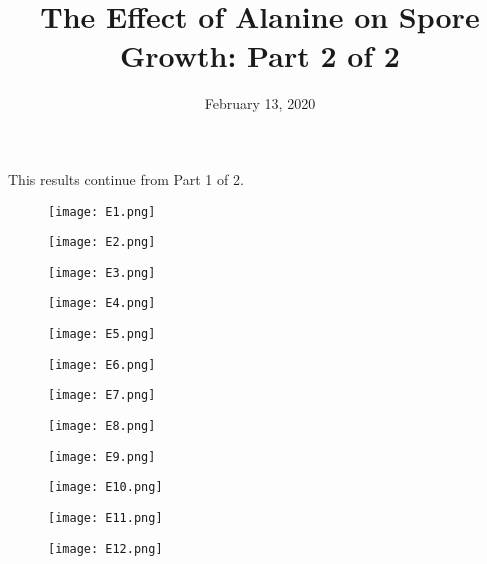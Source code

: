 \documentclass{article}
\title{The Effect of Alanine on Spore Growth: Part 2 of 2}
\date{February 13, 2020}
\begin{document}
\maketitle
 
This results continue from Part 1 of 2. 

\begin{figure}[!hb]
\centering
\texttt{[image:  E1.png]}
\end{figure}

\begin{figure}[!hb]
\centering
\texttt{[image:  E2.png]}
\end{figure}

\begin{figure}[!hb]
\centering
\texttt{[image:  E3.png]}
\end{figure}

\begin{figure}[!hb]
\centering
\texttt{[image:  E4.png]}
\end{figure}

\begin{figure}[!hb]
\centering
\texttt{[image:  E5.png]}
\end{figure}

\begin{figure}[!hb]
\centering
\texttt{[image:  E6.png]}
\end{figure}

\begin{figure}[!hb]
\centering
\texttt{[image:  E7.png]}
\end{figure}

\begin{figure}[!hb]
\centering
\texttt{[image:  E8.png]}
\end{figure}

\begin{figure}[!hb]
\centering
\texttt{[image:  E9.png]}
\end{figure}

\begin{figure}[!hb]
\centering
\texttt{[image:  E10.png]}
\end{figure}

\begin{figure}[!hb]
\centering
\texttt{[image:  E11.png]}
\end{figure}

\begin{figure}[!hb]
\centering
\texttt{[image:  E12.png]}
\end{figure}
\end{document}
